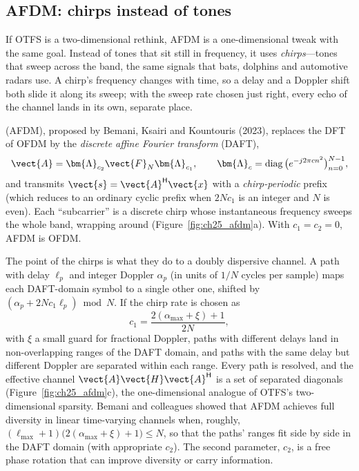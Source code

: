 \subsection{AFDM: chirps instead of tones}

If OTFS is a two-dimensional rethink, AFDM is a one-dimensional tweak with the same goal. Instead of
tones that sit still in frequency, it uses \emph{chirps}---tones that sweep across the band, the
same signals that bats, dolphins and automotive radars use. A chirp's frequency changes with time, so
a delay and a Doppler shift both slide it along its sweep; with the sweep rate chosen just right,
every echo of the channel lands in its own, separate place.

 (AFDM), proposed by Bemani, Ksairi and Kountouris
(2023), replaces the DFT of OFDM by the \emph{discrete affine Fourier transform} (DAFT),
\begin{equation}
\vect{A}=\bm{\Lambda}_{c_2}\vect{F}_N\bm{\Lambda}_{c_1},\qquad
\bm{\Lambda}_c=\operatorname{diag}\big(e^{-j2\pi cn^2}\big)_{n=0}^{N-1},
\label{eq:ch25:daft}
\end{equation}
and transmits $\vect{s}=\vect{A}^{\mathsf H}\vect{x}$ with a \emph{chirp-periodic} prefix (which reduces
to an ordinary cyclic prefix when $2Nc_1$ is an integer and $N$ is even). Each ``subcarrier'' is a
discrete chirp whose instantaneous frequency sweeps the whole band, wrapping around
(Figure~\ref{fig:ch25_afdm}a). With $c_1=c_2=0$, AFDM is OFDM.

The point of the chirps is what they do to a doubly dispersive channel. A path with delay $\ell_p$ and
integer Doppler $\alpha_p$ (in units of $1/N$ cycles per sample) maps each DAFT-domain symbol to a
single other one, shifted by $(\alpha_p+2Nc_1\ell_p)\bmod N$. If the chirp rate is chosen as
\begin{equation}
c_1=\frac{2(\alpha_{\max}+\xi)+1}{2N},
\label{eq:ch25:c1}
\end{equation}
with $\xi$ a small guard for fractional Doppler, paths with different delays land in non-overlapping
ranges of the DAFT domain, and paths with the same delay but different Doppler are separated within
each range. Every path is resolved, and the effective channel $\vect{A}\vect{H}\vect{A}^{\mathsf H}$ is a
set of separated diagonals (Figure~\ref{fig:ch25_afdm}c), the one-dimensional analogue of OTFS's
two-dimensional sparsity. Bemani and colleagues showed that AFDM achieves full diversity in linear
time-varying channels when, roughly, $(\ell_{\max}+1)\big(2(\alpha_{\max}+\xi)+1\big)\le N$, so that the
paths' ranges fit side by side in the DAFT domain (with appropriate $c_2$). The
second parameter, $c_2$, is a free phase rotation that can improve diversity or carry information.

